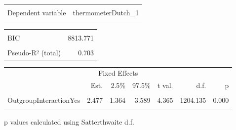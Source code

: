 \begin{table}[!h]
\centering
\begin{tabular}{lr}
\toprule
\cellcolor{gray!6}{Observations} & \cellcolor{gray!6}{1225}\\
Dependent variable & thermometerDutch\_1\\
\cellcolor{gray!6}{Type} & \cellcolor{gray!6}{Mixed effects linear regression}\\
\bottomrule
\end{tabular}
\end{table} \begin{table}[!h]
\centering
\begin{tabular}{lr}
\toprule
\cellcolor{gray!6}{AIC} & \cellcolor{gray!6}{8788.218}\\
BIC & 8813.771\\
\cellcolor{gray!6}{Pseudo-R² (fixed effects)} & \cellcolor{gray!6}{0.006}\\
Pseudo-R² (total) & 0.703\\
\bottomrule
\end{tabular}
\end{table} \begin{table}[!h]
\centering
\begin{threeparttable}
\begin{tabular}{lrrrrrr}
\toprule
\multicolumn{7}{c}{Fixed Effects} \\
\cmidrule(l{3pt}r{3pt}){1-7}
  & Est. & 2.5\% & 97.5\% & t val. & d.f. & p\\
\midrule
\cellcolor{gray!6}{(Intercept)} & \cellcolor{gray!6}{70.343} & \cellcolor{gray!6}{65.002} & \cellcolor{gray!6}{75.683} & \cellcolor{gray!6}{25.814} & \cellcolor{gray!6}{22.897} & \cellcolor{gray!6}{0.000}\\
OutgroupInteractionYes & 2.477 & 1.364 & 3.589 & 4.365 & 1204.135 & 0.000\\
\cellcolor{gray!6}{NonOutgroupInteractionyes} & \cellcolor{gray!6}{0.427} & \cellcolor{gray!6}{-0.683} & \cellcolor{gray!6}{1.538} & \cellcolor{gray!6}{0.754} & \cellcolor{gray!6}{1204.911} & \cellcolor{gray!6}{0.451}\\
\bottomrule
\end{tabular}
\begin{tablenotes}
\item  p values calculated using Satterthwaite d.f. 
\end{tablenotes}
\end{threeparttable}
\end{table} \begin{table}[!h]

\end{table}
